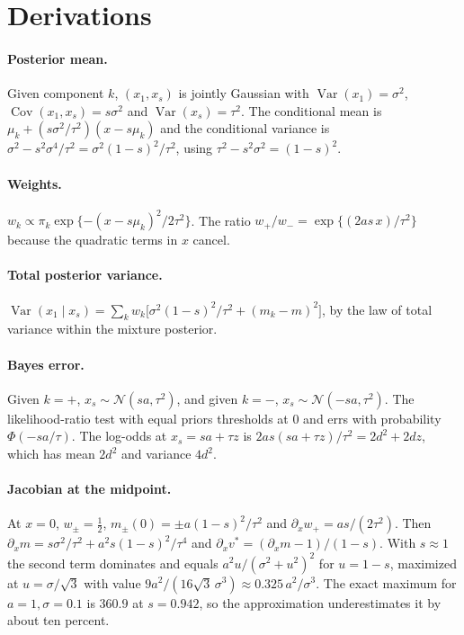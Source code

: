 \documentclass[11pt]{article}
\theoremstyle{definition}
\newcommand{\Var}{\operatorname{Var}}
\newcommand{\N}{\mathcal{N}}
\begin{document}
\appendix
\section{Derivations}

\paragraph{Posterior mean.} Given component $k$, $(x_1,x_s)$ is jointly Gaussian with $\Var(x_1)=\sigma^2$, $\operatorname{Cov}(x_1,x_s)=s\sigma^2$ and $\Var(x_s)=\tau^2$. The conditional mean is $\mu_k+(s\sigma^2/\tau^2)(x-s\mu_k)$ and the conditional variance is $\sigma^2-s^2\sigma^4/\tau^2=\sigma^2(1-s)^2/\tau^2$, using $\tau^2-s^2\sigma^2=(1-s)^2$.

\paragraph{Weights.} $w_k\propto\pi_k\exp\{-(x-s\mu_k)^2/2\tau^2\}$. The ratio $w_+/w_-=\exp\{(2as\,x)/\tau^2\}$ because the quadratic terms in $x$ cancel.

\paragraph{Total posterior variance.} $\Var(x_1\mid x_s)=\sum_k w_k\big[\sigma^2(1-s)^2/\tau^2+(m_k-m)^2\big]$, by the law of total variance within the mixture posterior.

\paragraph{Bayes error.} Given $k=+$, $x_s\sim\N(sa,\tau^2)$, and given $k=-$, $x_s\sim\N(-sa,\tau^2)$. The likelihood-ratio test with equal priors thresholds at $0$ and errs with probability $\Phi(-sa/\tau)$. The log-odds at $x_s=sa+\tau z$ is $2as(sa+\tau z)/\tau^2=2d^2+2dz$, which has mean $2d^2$ and variance $4d^2$.

\paragraph{Jacobian at the midpoint.} At $x=0$, $w_\pm=\tfrac12$, $m_\pm(0)=\pm a(1-s)^2/\tau^2$ and $\partial_xw_+=as/(2\tau^2)$. Then $\partial_xm=s\sigma^2/\tau^2+a^2s(1-s)^2/\tau^4$ and $\partial_xv^\ast=(\partial_xm-1)/(1-s)$. With $s\approx1$ the second term dominates and equals $a^2u/(\sigma^2+u^2)^2$ for $u=1-s$, maximized at $u=\sigma/\sqrt3$ with value $9a^2/(16\sqrt3\,\sigma^3)\approx0.325\,a^2/\sigma^3$. The exact maximum for $a=1,\sigma=0.1$ is $360.9$ at $s=0.942$, so the approximation underestimates it by about ten percent.
\end{document}
